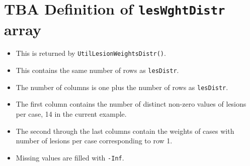 \documentclass[
]{book}
\providecommand{\tightlist}{%
  \setlength{\itemsep}{0pt}\setlength{\parskip}{0pt}}
\begin{document}
\hypertarget{quick-start-froc-data-lesion-weights}{%
\section{\texorpdfstring{TBA Definition of \texttt{lesWghtDistr} array}{TBA Definition of lesWghtDistr array}}\label{quick-start-froc-data-lesion-weights}}

\begin{itemize}
\tightlist
\item
  This is returned by \texttt{UtilLesionWeightsDistr()}.
\item
  This contains the same number of rows as \texttt{lesDistr}.
\item
  The number of columns is one plus the number of rows as \texttt{lesDistr}.
\item
  The first column contains the number of distinct non-zero values of lesions per case, 14 in the current example.
\item
  The second through the last columns contain the weights of cases with number of lesions per case corresponding to row 1.
\item
  Missing values are filled with \texttt{-Inf}.
\end{itemize}
\end{document}
